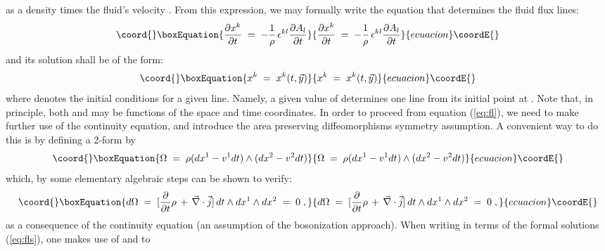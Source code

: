 \documentclass[a4paper,12pt]{article}
\begin{document}
as
a density \myHighlight{$\rho$}\coordHE{} times the fluid's velocity \coordHE{}. From this
expression, we may formally write the equation that determines the
fluid flux lines:
\begin{equation}\coord{}\boxEquation{
  \label{eq:fl}
\frac{\partial x^k}{\partial t} \;=\; - \frac{1}{\rho} \,
\epsilon^{kl} \frac{\partial A_l}{\partial t}          
}{
  \frac{\partial x^k}{\partial t} \;=\; - \frac{1}{\rho} \,
\epsilon^{kl} \frac{\partial A_l}{\partial t}          
}{ecuacion}\coordE{}\end{equation}
and its solution shall be of the form:
\begin{equation}\coord{}\boxEquation{
  \label{eq:fls}
x^k \;=\; x^k(t,{\vec y})
}{
  x^k \;=\; x^k(t,{\vec y})
}{ecuacion}\coordE{}\end{equation}
where \coordHE{} denotes the initial conditions for a given line.
Namely, a given value of \coordHE{} determines one line from its
initial point at \coordHE{}. Note that, in principle, both \myHighlight{$\rho$}\coordHE{} and
\coordHE{}
may be functions of the space and time coordinates. In order to
proceed from equation (\ref{eq:fl}), we need to make further use of
the continuity equation, and introduce the area preserving
diffeomorphisms symmetry assumption.  A convenient way to do this
is
by defining a 2-form \myHighlight{$\Omega$}\coordHE{} by
\begin{equation}\coord{}\boxEquation{
  \label{defom}
\Omega \;=\; \rho (dx^1-v^1 dt) \land (dx^2-v^2 dt) 
}{
  \Omega \;=\; \rho (dx^1-v^1 dt) \land (dx^2-v^2 dt) 
}{ecuacion}\coordE{}\end{equation}
which, by some elementary algebraic steps can be shown to verify:
\begin{equation}\coord{}\boxEquation{
  \label{eq:defo1}
d \Omega \;=\; [ \frac{\partial}{\partial t} \rho \,+\, {\vec
\nabla}\cdot{\vec j} ] \, dt \land dx^1 \land dx^2 \;=\; 0\;,
}{
  d \Omega \;=\; [ \frac{\partial}{\partial t} \rho \,+\, {\vec
\nabla}\cdot{\vec j} ] \, dt \land dx^1 \land dx^2 \;=\; 0\;,
}{ecuacion}\coordE{}\end{equation}
as a consequence of the continuity equation (an assumption of the
bosonization approach). When writing \myHighlight{$\Omega$}\coordHE{} in terms of the
formal
solutions (\ref{eq:fls}), one makes use of \coordHE{} and \coordHE{} to
\end{document}
